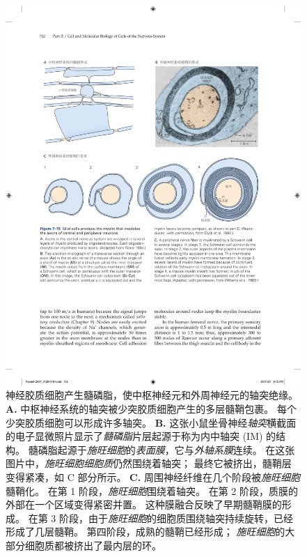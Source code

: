 \begin{figure}[htbp]
	\centering
	\includegraphics[width=1.0\linewidth]{chap07/fig_7_15}
	\caption{神经胶质细胞产生髓磷脂，使中枢神经元和外周神经元的轴突绝缘。
		\textbf{A.} 中枢神经系统的轴突被少突胶质细胞产生的多层髓鞘包裹。
		每个少突胶质细胞可以形成许多轴突\cite{raine1984morphology}。
		\textbf{B.} 这张小鼠坐骨神经\textit{轴突}横截面的电子显微照片显示了\textit{髓磷脂}片层起源于称为内中轴突 (IM) 的结构。
		髓磷脂起源于\textit{施旺细胞}的\textit{表面膜}，它与\textit{外轴系膜}连续。
		在这张图片中，\textit{施旺细胞细胞质}仍然围绕着轴突；
		最终它被挤出，髓鞘层变得紧凑，如 C 部分所示\cite{thomas1984clinical}。
		\textbf{C.} 周围神经纤维在几个阶段被\textit{施旺细胞}髓鞘化。
		在第 1 阶段，\textit{施旺细胞}围绕着轴突。
		在第 2 阶段，质膜的外部在一个区域变得紧密并置。
		这种膜融合反映了早期髓鞘膜的形成。
		在第 3 阶段，由于\textit{施旺细胞}的细胞质围绕轴突持续旋转，已经形成了几层髓鞘。
		第四阶段，成熟的髓鞘已经形成；
		\textit{施旺细胞}的大部分细胞质都被挤出了最内层的环\cite{williams1989bannister}。}
	\label{fig:7_15}
\end{figure}


